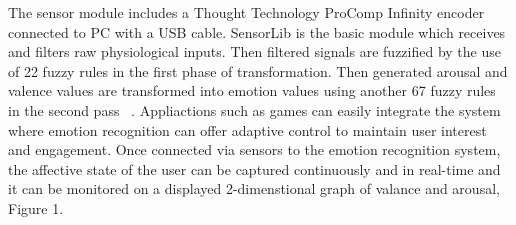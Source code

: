The sensor module includes a Thought Technology ProComp Infinity 
encoder ~\cite{tt2013procomp} connected to PC with a USB cable.
SensorLib is the basic module which receives and filters raw
physiological inputs. Then filtered signals are fuzzified by
the use of 22 fuzzy rules in the first phase of transformation.
Then generated arousal and valence values are transformed into
emotion values using another 67 fuzzy rules in
the second pass ~\cite{mandryk2007fuzzy}. Appliactions such as games can easily 
integrate the system where emotion recognition can offer
adaptive control to maintain user interest and engagement.
Once connected via sensors to the emotion recognition system, 
the affective state of the user can be captured continuously and
in real-time and it can be monitored on a displayed
2-dimenstional graph of valance and arousal, Figure 1.
